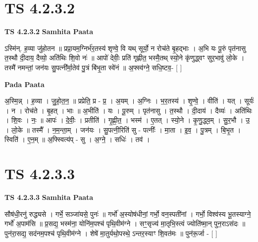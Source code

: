 \documentclass[17pt]{extarticle}
\begin{document}
\section*{ TS 4.2.3.2 }

\textbf{TS 4.2.3.2 } \newline
\textbf{Samhita Paata} \newline

ऽस्मि॑न्. ह॒व्या जु॑होतन ॥ प्रप्रा॒यम॒ग्निर्भ॑र॒तस्य॑ शृण्वे॒ वि यथ् सूर्यो॒ न रोच॑ते बृ॒हद्भाः । अ॒भि यः पू॒रुं पृत॑नासु त॒स्थौ दी॒दाय॒ दैव्यो॒ अति॑थिः शि॒वो नः॑ ॥ आपो॑ देवीः॒ प्रति॑ गृह्णीत॒ भस्मै॒तथ् स्यो॒ने कृ॑णुद्ध्वꣳ सुर॒भावु॑ लो॒के । तस्मै॑ नमन्तां॒ जन॑यः सु॒पत्नी᳚र्मा॒तेव॑ पु॒त्रं बि॑भृ॒ता स्वे॑नं ॥ अ॒फ्स्व॑ग्ने॒ सधि॒ष्टव॒- [  ] \newline

\textbf{Pada Paata} \newline

अ॒स्मि॒न्न् । ह॒व्या । जु॒हो॒त॒न॒ ॥ प्रप्रेति॒ प्र - प्र॒ । अ॒यम् । अ॒ग्निः । भ॒र॒तस्य॑ । शृ॒ण्वे॒ । वीति॑ । यत् । सूर्यः॑ । न । रोच॑ते । बृ॒हत् । भाः ॥ अ॒भीति॑ । यः । पू॒रुम् । पृत॑नासु । त॒स्थौ । दी॒दाय॑ । दैव्यः॑ । अति॑थिः । शि॒वः । नः॒ ॥ आपः॑ । दे॒वीः॒ । प्रतीति॑ । गृ॒ह्णी॒त॒ । भस्म॑ । ए॒तत् । स्यो॒ने । कृ॒णु॒द्ध्व॒म् । सु॒र॒भौ । उ॒ । लो॒के ॥ तस्मै᳚ । न॒म॒न्ता॒म् । जन॑यः । सु॒पत्नी॒रिति॑ सु - पत्नीः᳚ । मा॒ता । इ॒व॒ । पु॒त्रम् । बि॒भृ॒त । स्विति॑ । ए॒न॒म् ॥ अ॒फ्स्वित्य॑प् - सु । अ॒ग्ने॒ । सधिः॑ । तव॑ ।  \newline




\section*{ TS 4.2.3.3 }

\textbf{TS 4.2.3.3 } \newline
\textbf{Samhita Paata} \newline

सौष॑धी॒रनु॑ रुद्ध्यसे । गर्भे॒ सञ्जा॑यसे॒ पुनः॑ ॥ गर्भो॑ अ॒स्योष॑धीनां॒ गर्भो॒ वन॒स्पती॑नां । गर्भो॒ विश्व॑स्य भू॒तस्याग्ने॒ गर्भो॑ अ॒पाम॑सि ॥ प्र॒सद्य॒ भस्म॑ना॒ योनि॑म॒पश्च॑ पृथि॒वीम॑ग्ने । सꣳ॒॒सृज्य॑ मा॒तृभि॒स्त्वं ज्योति॑ष्मा॒न् पुन॒राऽस॑दः ॥ पुन॑रा॒सद्य॒ सद॑नम॒पश्च॑ पृथि॒वीम॑ग्ने । शेषे॑ मा॒तुर्यथो॒पस्थे॒ ऽन्तर॒स्याꣳ शि॒वत॑मः ॥ पुन॑रू॒र्जा - [  ] \newline
\end{document}
